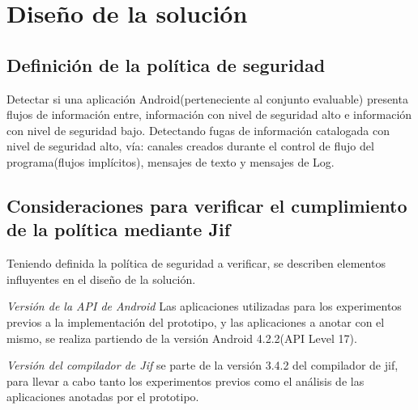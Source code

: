 
\section{Diseño de la solución} 
\subsection{Definición de la política de seguridad}
Detectar si una aplicación Android(perteneciente al conjunto evaluable) presenta
flujos de información entre, información con nivel de seguridad alto e
información con nivel de seguridad bajo.\newline 
Detectando fugas de información catalogada con nivel de seguridad alto, vía:
canales creados durante el control de flujo del programa(flujos implícitos),
mensajes de texto y mensajes de Log.\newline 

\subsection{Consideraciones para verificar el cumplimiento de la política
mediante Jif} 
Teniendo definida la política de seguridad a verificar, se describen
elementos influyentes en el diseño de la solución.

\textit{Versión de la API de Android}\newline
Las aplicaciones utilizadas para los experimentos previos a la implementación
del prototipo, y las aplicaciones a anotar con el mismo, se realiza partiendo de
la versión Android 4.2.2(API Level 17).

\textit{Versión del compilador de Jif}\newline
se parte de la versión 3.4.2 del compilador de jif, para llevar a cabo tanto los
experimentos previos como el análisis de las aplicaciones anotadas por el prototipo.

